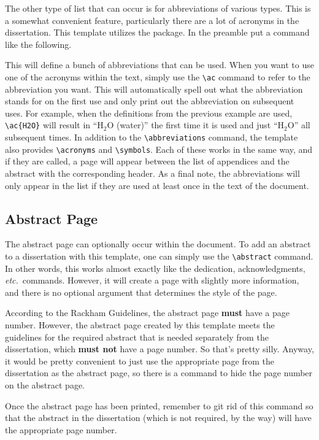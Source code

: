 \documentclass[thesis]{./tex/thesis-umich}
\begin{document}
The other type of list that can occur is for abbreviations of various
types.  This is a somewhat convenient feature, particularly there are a
lot of acronyms in the dissertation.  This template utilizes the
 package.  In the preamble put a command like the
following.
\begin{code}
\end{code}
This will define a bunch of abbreviations that can be used.  When you
want to use one of the acronyms within the text, simply use the
\verb|\ac| command to refer to the abbreviation you want.  This will
automatically spell out what the abbreviation stands for on the first
use and only print out the abbreviation on subsequent uses.  For
example, when the definitions from the previous example are used,
\verb|\ac{H2O}| will result in ``$\mathrm{H_2O}$ (water)'' the first
time it is used and just ``$\mathrm{H_2O}$'' all subsequent times.  In
addition to the \verb|\abbreviations| command, the template also
provides \verb|\acronyms| and \verb|\symbols|.  Each of these works in
the same way, and if they are called, a page will appear between the
list of appendices and the abstract with the corresponding header.  As a
final note, the abbreviations will only appear in the list if they are
used at least once in the text of the document.

\subsection{Abstract Page}
The abstract page can optionally occur within the document.  To add an
abstract to a dissertation with this template, one can simply use the
\verb|\abstract| command.  In other words, this works almost exactly
like the dedication, acknowledgments, \textit{etc.}~commands.  However,
it will create a page with slightly more information, and there is no
optional argument that determines the style of the page.

According to the Rackham Guidelines, the abstract page
\textsf{\textbf{must}} have a page number.  However, the abstract page
created by this template meets the guidelines for the required abstract
that is needed separately from the dissertation, which
\textsf{\textbf{must not}} have a page number.  So that's pretty silly.
Anyway, it would be pretty convenient to just use the appropriate page
from the dissertation as the abstract page, so there is a command to
hide the page number on the abstract page.
\begin{code}
\hideabstractpagenumber
\end{code}
Once the abstract page has been printed, remember to git rid of this
command so that the abstract in the dissertation (which is not required,
by the way) will have the appropriate page number.
\end{document}
